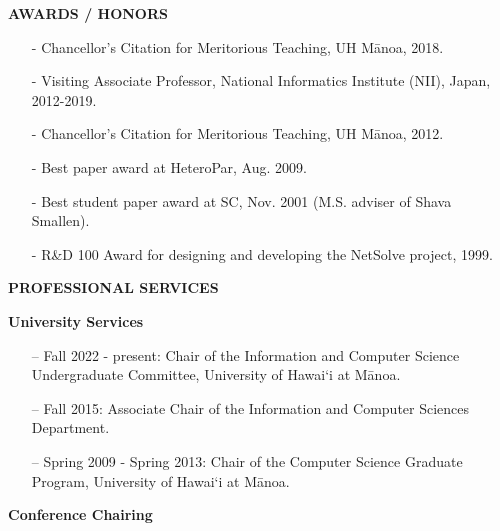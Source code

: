 \documentclass[times,11pt]{letter}
\begin{document}
\noindent
{\large{\bf AWARDS / HONORS}}
\begin{itemize}
\item[-] Chancellor's Citation for Meritorious Teaching, UH M\=anoa, 2018.
\item[-] Visiting Associate Professor, National Informatics Institute (NII), Japan, 2012-2019.
\item[-] Chancellor's Citation for Meritorious Teaching, UH M\=anoa, 2012.
\item[-] Best paper award at HeteroPar, Aug. 2009.
\item[-] Best student paper award at SC, Nov. 2001 (M.S. adviser of Shava Smallen).
\item[-] R\&D 100 Award for designing and developing the NetSolve project, 1999.
\end{itemize}

\noindent
{\large\bf{PROFESSIONAL SERVICES}}

\noindent
{\bf University Services}
\begin{itemize}
\item [--] Fall 2022 - present: Chair of the Information and Computer Science Undergraduate Committee, University of Hawai`i at M\=anoa.
\item [--] Fall 2015: Associate Chair of the Information and Computer Sciences Department. 
\item [--] Spring 2009 - Spring 2013: Chair of the Computer Science Graduate Program, University of Hawai`i at M\=anoa.
\end{itemize}

\noindent
{\bf Conference Chairing}
\end{document}
